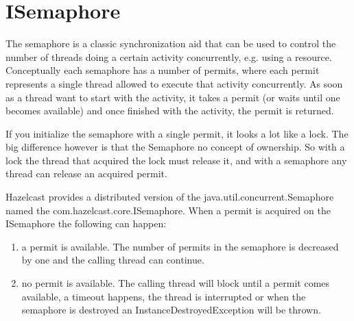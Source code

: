 \section{ISemaphore}
The semaphore is a classic synchronization aid that can be used to control the number of threads doing a certain activity concurrently, e.g. using a resource. Conceptually each semaphore has a number of permits, where each permit represents a single thread allowed to execute that activity concurrently. As soon as a thread want to start with the activity, it takes a permit (or waits until one becomes available) and once finished with the activity, the permit is returned.

If you initialize the semaphore with a single permit, it looks a lot like a lock. The big difference however is that the Semaphore no concept of ownership. So with a lock the thread that acquired the lock must release it, and with a semaphore any thread can release an acquired permit.

Hazelcast provides a distributed version of the java.util.concurrent.Semaphore named the com.hazelcast.core.ISemaphore. When a permit is acquired on the ISemaphore the following can happen:
\begin{enumerate}
\item a permit is available. The number of permits in the semaphore is decreased by one and the calling thread can continue. 
\item no permit is available. The calling thread will block until a permit comes available, a timeout happens, the thread is interrupted or when the semaphore is destroyed an InstanceDestroyedException will be thrown.
\end{enumerate}

